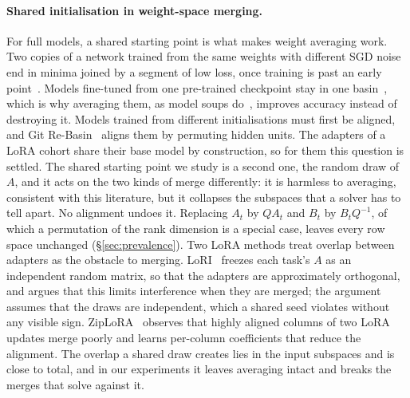 \paragraph{Shared initialisation in weight-space merging.} For full models, a
shared starting point is what makes weight averaging work. Two copies of a
network trained from the same weights with different SGD noise end in minima
joined by a segment of low loss, once training is past an early
point~\citep{frankle2020lmc}. Models fine-tuned from one pre-trained
checkpoint stay in one basin~\citep{neyshabur2020transfer}, which is why
averaging them, as model soups do~\citep{wortsman2022soups}, improves accuracy
instead of destroying it. Models trained from different initialisations must
first be aligned, and Git Re-Basin~\citep{ainsworth2023rebasin} aligns them by
permuting hidden units. The adapters of a LoRA cohort share their base model by
construction, so for them this question is settled. The shared starting point
we study is a second one, the random draw of $A$, and it acts on the two kinds
of merge differently: it is harmless to averaging, consistent with this
literature, but it collapses the subspaces that a solver has to tell apart. No
alignment undoes it. Replacing $A_t$ by $QA_t$ and $B_t$ by $B_tQ^{-1}$, of
which a permutation of the rank dimension is a special case, leaves every row
space unchanged (\S\ref{sec:prevalence}). Two LoRA methods treat overlap
between adapters as the obstacle to merging. LoRI~\citep{zhang2025lori}
freezes each task's $A$ as an independent random matrix, so that the adapters
are approximately orthogonal, and argues that this limits interference when
they are merged; the argument assumes that the draws are independent, which a
shared seed violates without any visible sign. ZipLoRA~\citep{shah2024ziplora}
observes that highly aligned columns of two LoRA updates merge poorly and
learns per-column coefficients that reduce the alignment. The overlap a shared
draw creates lies in the input subspaces and is close to total, and in our
experiments it leaves averaging intact and breaks the merges that solve
against it.

